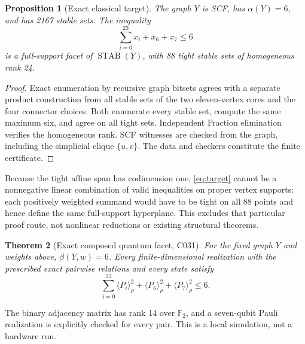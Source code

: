 \documentclass[11pt,a4paper]{article}
\newtheorem{theorem}{Theorem}[section]
\newtheorem{proposition}[theorem]{Proposition}
\theoremstyle{remark}\newtheorem{remark}[theorem]{Remark}
\newcommand{\STAB}{\operatorname{STAB}}
\newcommand{\ev}[1]{\langle#1\rangle_\rho}
\newcommand{\F}{\mathbb F}
\begin{document}
\begin{proposition}[Exact classical target]\label{prop:target}
The graph $Y$ is SCF, has $\alpha(Y)=6$, and has 2167 stable sets.
The inequality
\begin{equation}\label{eq:target}
 \sum_{i=0}^{23}x_i+x_6+x_7\leq6
\end{equation}
is a full-support facet of $\STAB(Y)$, with 88 tight stable sets of
homogeneous rank 24.
\end{proposition}
\begin{proof}
Exact enumeration by recursive graph bitsets agrees with a separate
product construction from all stable sets of the two eleven-vertex
cores and the four connector choices. Both enumerate every stable set,
compute the same maximum six, and agree on all tight sets. Independent
Fraction elimination verifies the homogeneous rank. SCF witnesses are
checked from the graph, including the simplicial clique $\{u,v\}$.
The data and checkers constitute the finite certificate.
\end{proof}
Because the tight affine span has codimension one, \eqref{eq:target}
cannot be a nonnegative linear combination of valid inequalities on
proper vertex supports: each positively weighted summand would have to
be tight on all 88 points and hence define the same full-support
hyperplane. This excludes that particular proof route, not nonlinear
reductions or existing structural theorems.

\begin{theorem}[Exact composed quantum facet, C031]\label{thm:target}
For the fixed graph $Y$ and weights above, $\beta(Y,w)=6$. Every
finite-dimensional realization with the prescribed exact pairwise
relations and every state satisfy
\begin{equation}\label{eq:quantumtarget}
 \sum_{i=0}^{23}\ev{P_i}^2+\ev{P_6}^2+\ev{P_7}^2\leq6.
\end{equation}
\end{theorem}
The binary adjacency matrix has
rank 14 over $\F_2$, and a seven-qubit Pauli realization is explicitly
checked for every pair. This is a local simulation, not a hardware run.
\end{document}
